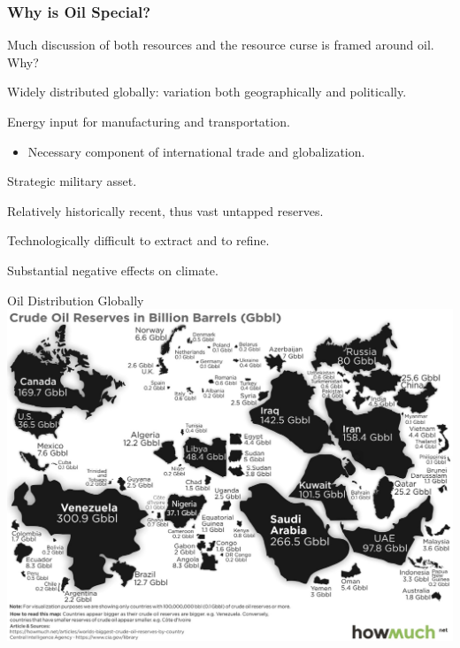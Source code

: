 \documentclass{beamer}
\begin{document}
\begin{frame} 
	\frametitle{\LARGE{Why is Oil Special?}}
	Much discussion of both resources and the resource curse is framed around oil. Why? \pause
	\begin{itemize}
		\large{  
			\item Widely distributed globally: variation both geographically and politically. \pause
			
			\item Energy input for manufacturing and transportation. \pause
			\begin{itemize}
				\item Necessary component of international trade and globalization. \pause
			\end{itemize}
			
			\item Strategic military asset. \pause 
			
			\item Relatively historically recent, thus vast untapped reserves. \pause 
			
			\item Technologically difficult to extract and to refine. \pause 
			
			\item Substantial negative effects on climate.
		}
	\end{itemize}
\end{frame}

\begin{frame}{\LARGE Oil Distribution Globally}
	\centering
	\includegraphics[width=\textwidth,height=0.9\textheight,keepaspectratio]{oil distribution.jpg}
\end{frame}
\end{document}
